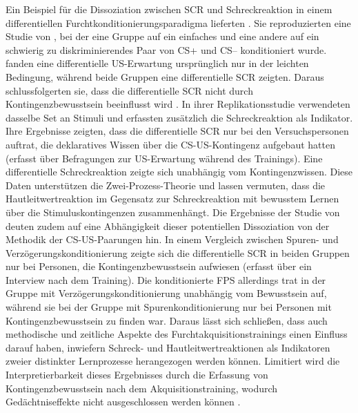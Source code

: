 		Ein Beispiel für die Dissoziation zwischen SCR und Schreckreaktion in einem differentiellen Furchtkonditionierungsparadigma lieferten \textcite{SEVENSTER2014}. Sie reproduzierten eine Studie von \textcite{SCHULTZ2010}, bei der eine Gruppe auf ein einfaches und eine andere auf ein schwierig zu diskriminierendes Paar von CS+ und CS-- konditioniert wurde. \textcite{SCHULTZ2010} fanden eine differentielle US-Erwartung ursprünglich nur in der leichten Bedingung, während beide Gruppen eine differentielle SCR zeigten. Daraus schlussfolgerten sie, dass die differentielle SCR nicht durch Kontingenzbewusstsein beeinflusst wird \parencite{SCHULTZ2010}. In ihrer Replikationsstudie verwendeten \textcite{SEVENSTER2014} dasselbe Set an Stimuli und erfassten zusätzlich die Schreckreaktion als Indikator. Ihre Ergebnisse zeigten, dass die differentielle SCR nur bei den Versuchspersonen auftrat, die deklaratives Wissen über die CS-US-Kontingenz aufgebaut hatten (erfasst über Befragungen zur US-Erwartung während des Trainings). Eine differentielle Schreckreaktion zeigte sich unabhängig vom Kontingenzwissen. Diese Daten unterstützen die Zwei-Prozess-Theorie und lassen vermuten, dass die Hautleitwertreaktion im Gegensatz zur Schreckreaktion mit bewusstem Lernen über die Stimuluskontingenzen zusammenhängt. 
		Die Ergebnisse der Studie von \textcite{WEIKE2007} deuten zudem auf eine Abhängigkeit dieser potentiellen Dissoziation von der Methodik der CS-US-Paarungen hin. In einem Vergleich zwischen Spuren- und Verzögerungskonditionierung zeigte sich die differentielle SCR in beiden Gruppen nur bei Personen, die Kontingenzbewusstsein aufwiesen (erfasst über ein Interview nach dem Training). Die konditionierte FPS allerdings trat in der Gruppe mit Verzögerungskonditionierung unabhängig vom Bewusstsein auf, während sie bei der Gruppe mit Spurenkonditionierung nur bei Personen mit Kontingenzbewusstsein zu finden war. 
		Daraus lässt sich schließen, dass auch methodische und zeitliche Aspekte des Furchtakquisitionstrainings einen Einfluss darauf haben, inwiefern Schreck- und Hautleitwertreaktionen als Indikatoren zweier distinkter Lernprozesse herangezogen werden können. Limitiert wird die Interpretierbarkeit dieses Ergebnisses durch die Erfassung von Kontingenzbewusstsein nach dem Akquisitionstraining, wodurch Gedächtniseffekte nicht ausgeschlossen werden können \parencite{MERTENS2020}. 
		
